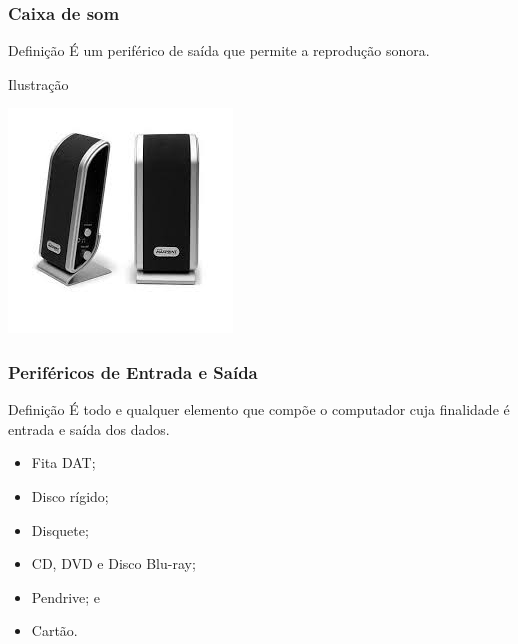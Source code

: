 \documentclass[aspectratio=169]{beamer} %
\begin{document}
\begin{frame}
	\frametitle{Caixa de som}
	
	\begin{block}{Defini\c cão}
		É um periférico de saída que permite a reprodução sonora.
	\end{block}\vfill
	
	\begin{exampleblock}{Ilustra\c cão}
		\begin{center}
			\includegraphics[scale=0.5]{img/caixa-de-som}
		\end{center}		
	\end{exampleblock}
\end{frame}


\begin{frame}
	\frametitle{Periféricos de Entrada e Saída}
	
	\begin{block}{Defini\c cão}
		É todo e qualquer elemento que compõe o computador cuja finalidade é entrada e saída dos dados.
	\end{block}\vfill
	
	\begin{itemize}
		\item Fita DAT;
		\item Disco rígido;
		\item Disquete;
		\item CD, DVD e Disco Blu-ray; 
		\item Pendrive; e
		\item Cartão.
	\end{itemize}
\end{frame}
\end{document}
